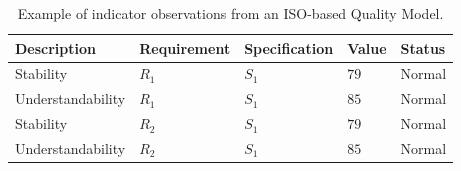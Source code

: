 \begin{table}[!htb]
\renewcommand{\arraystretch}{1.3}
\scriptsize
\begin{center}
\begin{tabular}{|p{2.5cm}|p{3cm}|p{2cm}|p{1cm}|p{1.5cm}|}
\hline
  \textbf{Description} & \textbf{Requirement} & \textbf{Specification} & \textbf{Value} & \textbf{Status} \\  \hline
  Stability & $R_1$ & $S_1$ & $79$ & Normal \\ \hline
  Understandability & $R_1$ & $S_1$  & $85$ & Normal\\ \hline
  Stability & $R_2$ & $S_1$ & $79$ & Normal \\ \hline
  Understandability & $R_2$ & $S_1$  & $85$ & Normal\\ \hline
  \hline
  \end{tabular}
  \caption{Example of indicator observations from an ISO-based Quality Model.}
  \label{tab:example-wb}
  \end{center}	 
\end{table} 

% 
% 
% 
% 	 	
% 
% 
